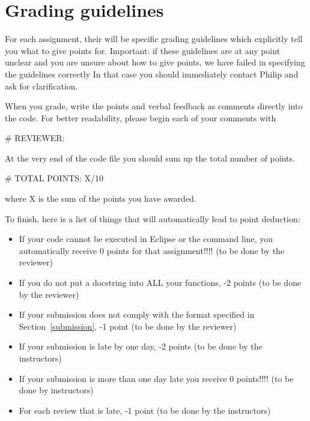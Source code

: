 \documentclass[a4paper, leqno, 11pt]{article}
\begin{document}
\section{Grading guidelines}
For each assignment, their will be specific grading guidelines which explicitly tell you what to give points for. Important: if these
guidelines are at any point unclear and you are unsure about how to give points, we have failed in specifying the guidelines correctly
In that case you should immediately contact Philip and ask for clarification.

When you grade, write the points and verbal feedback as comments
directly into the code. For better readability, please begin each of
your comments with
\begin{center}
\# REVIEWER: 
\end{center}
At the very end of the code file you should sum up the total number of points. 
\begin{center}
\# TOTAL POINTS: X/10 
\end{center}
where X is the sum of the points you have awarded.

To finish, here is a list of things that will automatically lead to point deduction:
\begin{itemize}
\item If your code cannot be executed in Eclipse or the command line, you automatically receive 0 points for that assignment!!!! (to be done by the reviewer) 
\item If you do not put a docstring into ALL your functions, -2 points (to be done by the reviewer)
\item If your submission does not comply with the format specified in Section~\ref{submission}, -1 point (to be done by the reviewer)
\item If your submission is late by one day, -2 points (to be done by the instructors)
\item If your submission is more than one day late you receive 0 points!!!! (to be done by instructors)
\item For each review that is late, -1 point (to be done by the instructors)
\end{itemize}
\end{document}
